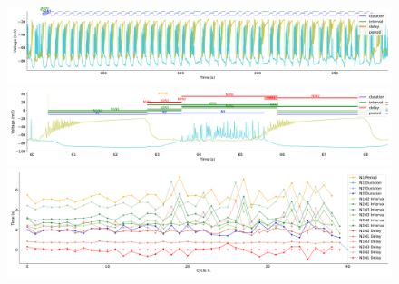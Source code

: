 \begin{figure}[htbp]
	\centering
	\begin{minipage}[b]{\textwidth}
		\centering
		\includegraphics[width=\textwidth,height=0.1\textheight]{./invariants/data/SUSSEX/CV1a_driven1/images/stim_cv1a1_3phases_signal_intervals_zoom.pdf}
		\includegraphics[width=\textwidth]{./invariants/data/SUSSEX/CV1a_driven1/images/stim_cv1a1_3phases_signal_intervals_cycle.pdf}
		\includegraphics[width=\textwidth]{./invariants/data/SUSSEX/CV1a_driven1/images/stim_cv1a1_3phases_time_cycle.pdf}
	\end{minipage}
	\centering
	\begin{minipage}[b]{0.45\textwidth}
		\centering

\end{minipage}
\end{figure}
